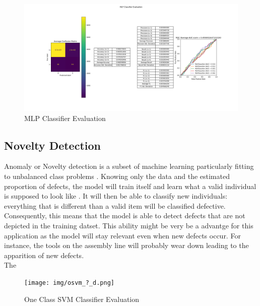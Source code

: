 \begin{figure}
    \centering
    \includegraphics[scale=0.32]{img/mlp_d.png}
    \caption{MLP Classifier Evaluation}
    \label{mlp_d}
\end{figure}

\subsection{Novelty Detection}
Anomaly or Novelty detection is a subset of machine learning particularly
fitting to unbalanced class problems \cite{novel_scikit}. Knowing only the data
and the estimated proportion of defects, the model will train itself and learn
what a valid individual is supposed to look like \cite{novel_yt}. It will then
be able to classify new individuals: everything that is different than a valid
item will be classified defective. Consequently, this means that the model is
able to detect defects that are not depicted in the training datset. This
ability might be very be a advantge for this application as the model will stay
relevant even when new defects occur. For instance, the tools on the assembly
line will probably wear down leading to the apparition of new defects.\\

The

\begin{figure}
    \centering
    \texttt{[image: img/osvm\_?\_d.png]}
    \caption{One Class SVM Classifier Evaluation}
    \label{osvm_d}
\end{figure}